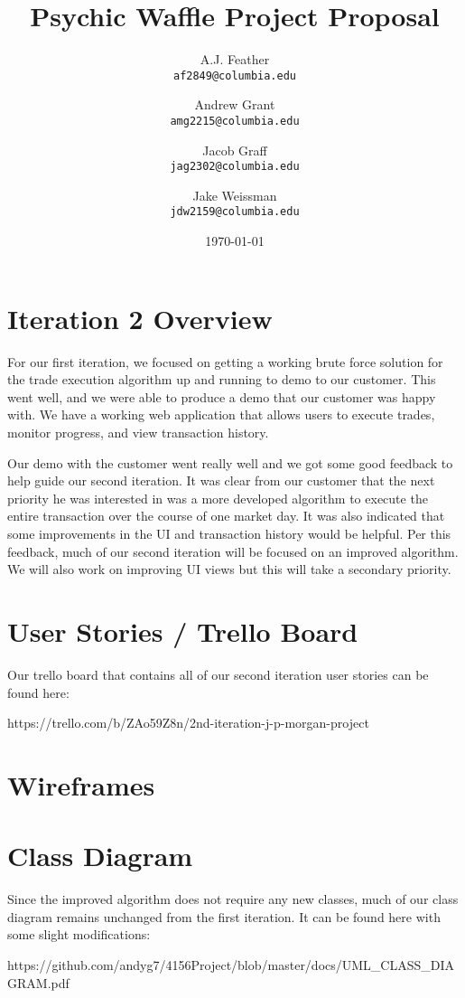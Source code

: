 \documentclass{article}
\title{Psychic Waffle Project Proposal}
\author{
    A.J. Feather\\
    \texttt{af2849@columbia.edu}
    \and
    Andrew Grant\\
    \texttt{amg2215@columbia.edu}
    \and
    Jacob Graff\\
    \texttt{jag2302@columbia.edu}
    \and
    Jake Weissman\\
    \texttt{jdw2159@columbia.edu}
}
\date{\today}
\begin{document}
\maketitle

\section{Iteration 2 Overview}

For our first iteration, we focused on getting a working brute force solution for the trade execution algorithm up and running to demo to our customer. This went well, and we were able to produce a demo that our customer was happy with. We have a working web application that allows users to execute trades, monitor progress, and view transaction history.

Our demo with the customer went really well and we got some good feedback to help guide our second iteration. It was clear from our customer that the next priority he was interested in was a more developed algorithm to execute the entire transaction over the course of one market day. It was also indicated that some improvements in the UI and transaction history would be helpful. Per this feedback, much of our second iteration will be focused on an improved algorithm. We will also work on improving UI views but this will take a secondary priority.

\section{User Stories / Trello Board}

Our trello board that contains all of our second iteration user stories can be found here: 

https://trello.com/b/ZAo59Z8n/2nd-iteration-j-p-morgan-project

\section{Wireframes}

\section{Class Diagram}
Since the improved algorithm does not require any new classes, much of our class diagram remains unchanged from the first iteration. It can be found here with some slight modifications:

https://github.com/andyg7/4156Project/blob/master/docs/UML_CLASS_DIAGRAM.pdf
\end{document}
